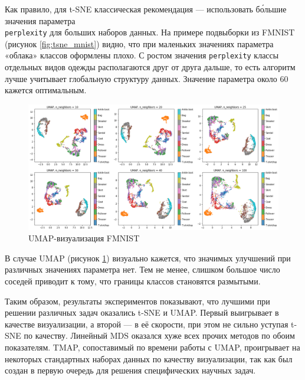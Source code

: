 \documentclass[10pt, a4paper]{extarticle}
\newcommand{\code}[1]{\texttt{#1}}
\begin{document}
Как правило, для t-SNE классическая рекомендация — использовать б\'ольшие значения параметра \\ \code{perplexity} для больших наборов данных.
На примере подвыборки из FMNIST (рисунок \ref{fig:tsne_mnist}) видно, что при маленьких значениях параметра «облака» классов оформлены плохо.
С ростом значения \code{perplexity} классы отдельных видов одежды располагаются друг от друга дальше, то есть алгоритм лучше учитывает глобальную структуру данных.
Значение параметра около 60 кажется оптимальным.

\begin{figure}[h!]
    \vspace{1em}
    \centering
    \includegraphics[width=\linewidth]{umap_mnist.png}
    \caption{UMAP-визуализация FMNIST}
    \label{fig:umap_mnist}
\end{figure}


В случае UMAP (рисунок \ref{fig:umap_mnist}) визуально кажется, что значимых улучшений при различных значениях параметра нет.
Тем не менее, слишком большое число соседей приводит к тому, что границы классов становятся размытыми.

\begin{shaded}
Таким образом, результаты экспериментов показывают, что лучшими при решении различных задач оказались t-SNE и UMAP. Первый выигрывает в качестве визуализации, а второй — в её скорости, при этом не сильно уступая t-SNE по качеству. Линейный MDS оказался хуже всех прочих методов по обоим показателям. TMAP, сопоставимый по времени работы с UMAP, проигрывает на некоторых стандартных наборах данных по качеству визуализации, так как  был создан в первую очередь для решения специфических научных задач.
\end{shaded}

\newpage

\printbibliography
\end{document}
